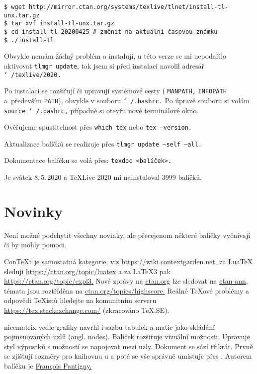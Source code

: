 \begin{lstlisting}
$ wget http://mirror.ctan.org/systems/texlive/tlnet/install-tl-unx.tar.gz
$ tar xvf install-tl-unx.tar.gz
$ cd install-tl-20200425 # změnit na aktuální časovou známku
$ ./install-tl
\end{lstlisting}

Obvykle nemám žádný problém a instaluji, u této verze se mi nepodařilo aktivovat \texttt{tlmgr update}, tak jsem si před instalací navolil adresář 
\texttt{\char`~/texlive/2020.}

Po instalaci se rozšiřují či upravují systémové cesty (%
\texttt{MANPATH,}
\texttt{INFOPATH} a~především 
\texttt{PATH}), obvykle v souboru \texttt{\char`~/.bashrc.} 
Po úpravě souboru si volám 
\texttt{source \char`~/.bashrc,} případně si otevřu nové terminálové okno.

Ověřujeme spustitelnost přes 
\texttt{which tex}
nebo
\texttt{tex --version.}

Aktualizace balíčků se realizuje přes
\texttt{tlmgr update --self --all.}

Dokumentace balíčku se volá přes: 
\texttt{texdoc <balíček>.}

Je svátek 8.\,5.\,2020 a \TeX Live 2020 mi nainstaloval 3999 balíčků.


\section{Novinky}

Není možné podchytit všechny novinky, ale přecejenom některé balíčky vyč\-nívají či by mohly pomoci. 

Con\TeX t je samostatná kategorie, viz 
\href{https://wiki.contextgarden.net/Main_Page}{\url{https://wiki.contextgarden.net}}, za Lua\TeX{} sleduji 
\href{https://ctan.org/topic/luatex}{\url{https://ctan.org/topic/luatex}} a za \LaTeX3 pak 
\href{https://ctan.org/topic/expl3}{\url{https://ctan.org/topic/expl3.}} Nové zprávy na \href{https://www.ctan.org}{\url{ctan.org}} lze sledovat na 
\href{https://lists.dante.de/pipermail/ctan-ann/}{\url{ctan-ann}}, témata jsou roztříděna na 
\href{https://ctan.org/topics/highscore}{\url{ctan.org/topics/highscore}.} Reálné \TeX ové problémy a odpovědi \TeX istů hledejte na komunitním serveru
\href{https://tex.stackexchange.com/}{\url{https://tex.stackexchange.com/}} (zkracováno \TeX.SE).


\pis nicematrix
\maltikz{} vedle grafiky navrhl i sazbu tabulek a matic jako skládání pojmenovaných uzlů (angl. nodes). Balíček  rozšiřuje vizuální možnosti. Upravuje styl výpustků s možností se napojovat mezi uzly. Dokument se sází třikrát. Prvně se zjišťují rozměry pro knihovnu \maltikz u  a poté se vše správně umisťuje přes . Autorem balíčku je 
\href{https://ctan.org/author/pantigny}{François Pantigny.}
\kod

